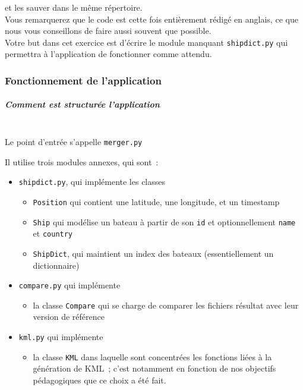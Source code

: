 et les sauver dans le même répertoire.\\

Vous remarquerez que le code est cette fois entièrement rédigé en
anglais, ce que nous vous conseillons de faire aussi souvent que
possible.\\

Votre but dans cet exercice est d'écrire le module manquant
\texttt{shipdict.py} qui permettra à l'application de fonctionner comme
attendu.


    \hypertarget{fonctionnement-de-lapplication}{%
\subsubsection{Fonctionnement de
l'application}\label{fonctionnement-de-lapplication}}

    \hypertarget{comment-est-structuruxe9e-lapplication}{%
\subparagraph{Comment est structurée
l'application\\\\}\label{comment-est-structuruxe9e-lapplication}}

    Le point d'entrée s'appelle \texttt{merger.py}

Il utilise trois modules annexes, qui sont~:

\begin{itemize}
\tightlist
\item
  \texttt{shipdict.py}, qui implémente les classes

  \begin{itemize}
  \tightlist
  \item
    \texttt{Position} qui contient une latitude, une longitude, et un
    timestamp
  \item
    \texttt{Ship} qui modélise un bateau à partir de son \texttt{id} et
    optionnellement \texttt{name} et \texttt{country}
  \item
    \texttt{ShipDict}, qui maintient un index des bateaux
    (essentiellement un dictionnaire)
  \end{itemize}
\item
  \texttt{compare.py} qui implémente

  \begin{itemize}
  \tightlist
  \item
    la classe \texttt{Compare} qui se charge de comparer les fichiers
    résultat avec leur version de référence
  \end{itemize}
\item
  \texttt{kml.py} qui implémente

  \begin{itemize}
  \tightlist
  \item
    la classe \texttt{KML} dans laquelle sont concentrées les fonctions
    liées à la génération de KML~; c'est notamment en fonction de nos
    objectifs pédagogiques que ce choix a été fait.
  \end{itemize}
\end{itemize}

